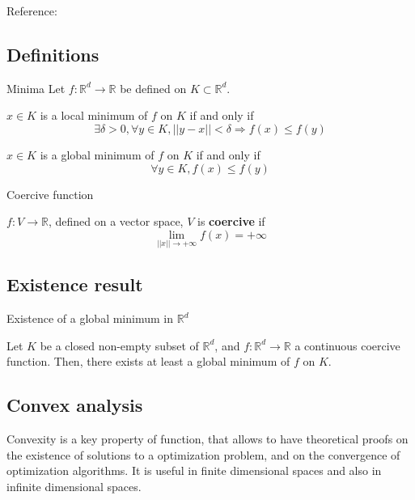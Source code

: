 \documentclass[
10pt, %
a4paper, %
oneside, %
headinclude,footinclude, %
BCOR5mm, %
]{scrartcl}
\begin{document}
Reference: \cite[]{Allaire2012} 

\subsection{\large\color{MidnightBlue}Definitions}

\begin{definition}{Minima}
    Let $f: \mathbb{R}^d\rightarrow \mathbb{R}$ be defined on $K\subset \mathbb{R}^d$.

    $x\in K$ is a local minimum of $f$ on $K$ if and only if
    \begin{equation*}
	\exists \delta>0, \forall y\in K, ||y-x||<\delta \Rightarrow f(x)\leq f(y)
    \end{equation*}

    $x\in K$ is a global minimum of $f$ on $K$ if and only if
    \begin{equation*}
	\forall y\in K, f(x)\leq f(y)
    \end{equation*}
\end{definition}

\begin{definition}{Coercive function}

    $f:V\rightarrow \mathbb{R} $, defined on a vector space, $V$ is \textbf{{coercive}} if 
    \begin{equation*}
	\lim_{||x||\rightarrow +\infty}f(x)=+\infty
    \end{equation*}
\end{definition}

\subsection{\large\color{MidnightBlue}Existence result}

\begin{theorem}{Existence of a global minimum in $\mathbb{R}^d$}
    \label{th:dimfinie}

    Let $K$ be a closed non-empty subset of $ \mathbb{R}^d$, and $f: \mathbb{R}^d\rightarrow \mathbb{R} $ a continuous coercive function. Then, there exists at least a global minimum of $f$ on $K$.
\end{theorem}

\subsection{\large\color{MidnightBlue}Convex analysis}

Convexity is a key property of function, that allows to have theoretical proofs on the existence of solutions to a optimization problem, and on the convergence of optimization algorithms. It is useful in finite dimensional spaces and also in infinite dimensional spaces.
\end{document}
